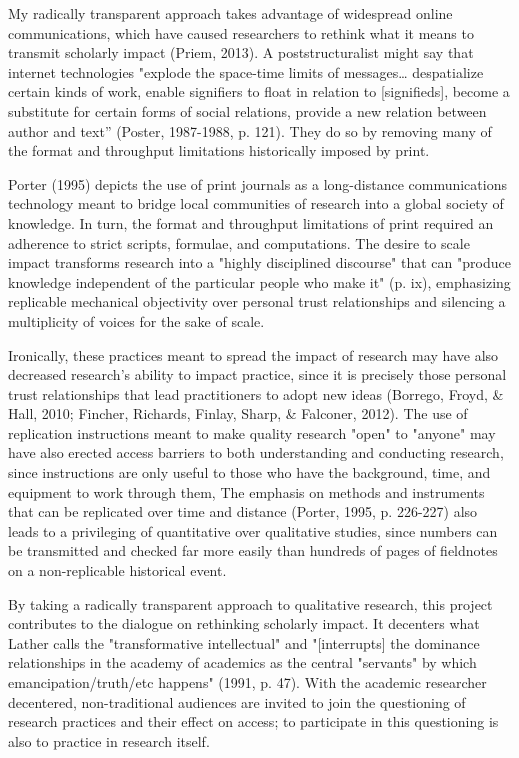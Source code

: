 My radically transparent approach takes advantage of widespread online communications, which have caused researchers to rethink what it means to transmit scholarly impact (Priem, 2013). A poststructuralist might say that internet technologies "explode the space-time limits of messages… despatialize certain kinds of work, enable signifiers to float in relation to [signifieds], become a substitute for certain forms of social relations, provide a new relation between author and text” (Poster, 1987-1988, p. 121). They do so by removing many of the format and throughput limitations historically imposed by print. 

Porter (1995) depicts the use of print journals as a long-distance communications technology meant to bridge local communities of research into a global society of knowledge. In turn, the format and throughput limitations of print required an adherence to strict scripts, formulae, and computations. The desire to scale impact transforms research into a "highly disciplined discourse" that can "produce knowledge independent of the particular people who make it" (p. ix), emphasizing replicable mechanical objectivity over personal trust relationships and silencing a multiplicity of voices for the sake of scale.

Ironically, these practices meant to spread the impact of research may have also decreased research's ability to impact practice, since it is precisely those personal trust relationships that lead practitioners to adopt new ideas (Borrego, Froyd, & Hall, 2010; Fincher, Richards, Finlay, Sharp, & Falconer, 2012). The use of replication instructions meant to make quality research "open" to "anyone" may have also erected access barriers to both understanding and conducting research, since instructions are only useful to those who have the background, time, and equipment to work through them, The emphasis on methods and instruments that can be replicated over time and distance (Porter, 1995, p. 226-227) also leads to a privileging of quantitative over qualitative studies, since numbers can be transmitted and checked far more easily than hundreds of pages of fieldnotes on a non-replicable historical event.

By taking a radically transparent approach to qualitative research, this project contributes to the dialogue on rethinking scholarly impact. It decenters what Lather calls the "transformative intellectual" and "[interrupts] the dominance relationships in the academy of academics as the central "servants" by which emancipation/truth/etc happens" (1991, p. 47). With the academic researcher decentered, non-traditional audiences are invited to join the questioning of research practices and their effect on access; to participate in this questioning is also to practice in research itself.

